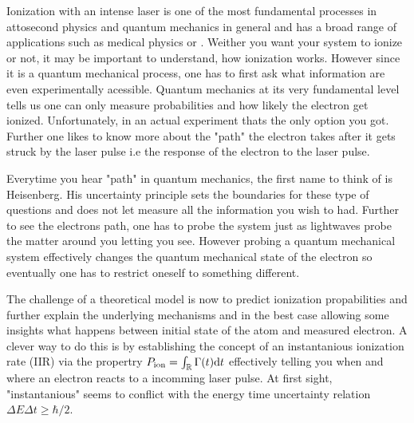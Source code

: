 Ionization with an intense laser is one of the most fundamental processes in attosecond physics and quantum mechanics in general and has a broad range of applications such as medical physics or .
Weither you want your system to ionize or not, it may be important to understand, how ionization works.
However since it is a quantum mechanical process, one has to first ask what information are even experimentally acessible.
Quantum mechanics at its very fundamental level tells us one can only measure probabilities and how likely the electron get ionized.
Unfortunately, in an actual experiment thats the only option you got.
Further one likes to know more about the "path" the electron takes after it gets struck by the laser pulse i.e the response of the electron to the laser pulse.

Everytime you hear "path" in quantum mechanics, the first name to think of is Heisenberg.
His uncertainty principle sets the boundaries for these type of questions and does not let measure all the information you wish to had.
Further to see the electrons path, one has to probe the system just as lightwaves probe the matter around you letting you see.
However probing a quantum mechanical system effectively changes the quantum mechanical state of the electron so eventually one has to restrict oneself to something different.

The challenge of a theoretical model is now to predict ionization propabilities and further explain the underlying mechanisms and in the best case allowing some insights what happens between initial state of the atom and measured electron.
A clever way to do this is by establishing the concept of an instantanious ionization rate (IIR) via the propertry $P_{\mathrm{ion}}=\int_{\mathbb{R}}\Gamma (t)\mathrm{d} t$ effectively telling you when and where an electron reacts to a incomming laser pulse.
At first sight, "instantanious" seems to conflict with the energy time uncertainty relation $\Delta E \Delta t \geq \hbar/2$.



